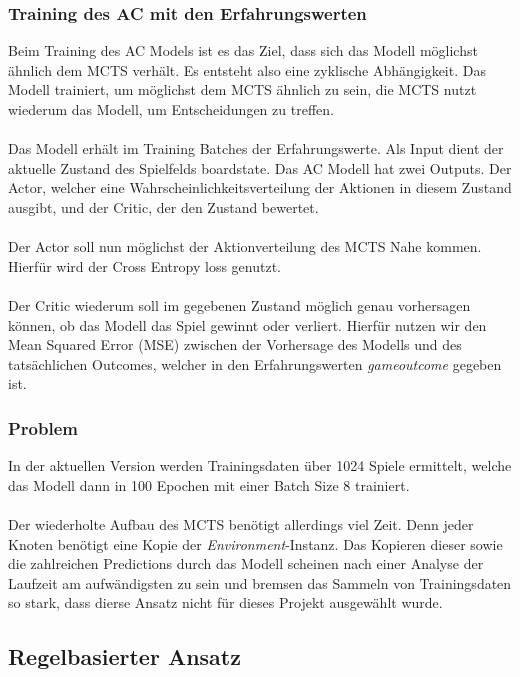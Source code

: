 \subsubsection*{Training des AC mit den Erfahrungswerten}
Beim Training des AC Models ist es das Ziel, dass sich das Modell möglichst ähnlich dem MCTS verhält. Es entsteht also eine zyklische Abhängigkeit. Das Modell trainiert, um möglichst dem MCTS ähnlich zu sein, die MCTS nutzt wiederum das Modell, um Entscheidungen zu treffen. 
\\\\
Das Modell erhält im Training Batches der Erfahrungswerte. Als Input dient der aktuelle Zustand des Spielfelds board\textunderscore{}state. Das AC Modell hat zwei Outputs. Der Actor, welcher eine Wahrscheinlichkeitsverteilung der Aktionen in diesem Zustand ausgibt, und der Critic, der den Zustand bewertet. 
\\\\
Der Actor soll nun möglichst der Aktionverteilung des MCTS Nahe kommen. Hierfür wird der Cross Entropy loss genutzt.
\\\\
Der Critic wiederum soll im gegebenen Zustand möglich genau vorhersagen können, ob das Modell das Spiel gewinnt oder verliert. Hierfür nutzen wir den Mean Squared Error (MSE) zwischen der Vorhersage des Modells und des tatsächlichen Outcomes, welcher in den Erfahrungswerten \textit{game\textunderscore{}outcome} gegeben ist.

\subsubsection*{Problem}
In der aktuellen Version werden Trainingsdaten über 1024 Spiele ermittelt, welche das Modell dann in 100 Epochen mit einer Batch Size 8 trainiert.
\\\\
Der wiederholte Aufbau des MCTS benötigt allerdings viel Zeit. Denn jeder Knoten benötigt eine Kopie der \textit{Environment}-Instanz. Das Kopieren dieser sowie die zahlreichen Predictions durch das Modell scheinen nach einer Analyse der Laufzeit am aufwändigsten zu sein und bremsen das Sammeln von Trainingsdaten so stark, dass dierse Ansatz nicht für dieses Projekt ausgewählt wurde.

\subsection{Regelbasierter Ansatz}

